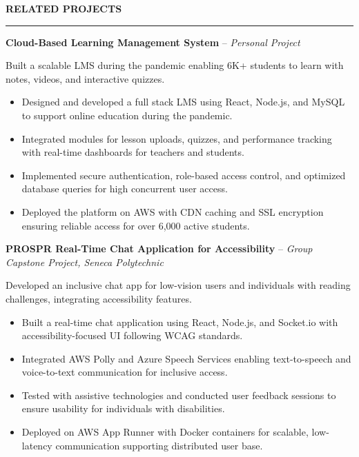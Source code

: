 \documentclass[10pt,letterpaper]{article}
\begin{document}
\vspace{6pt}

\textbf{RELATED PROJECTS}\\[-8pt]
\noindent\rule{\textwidth}{1pt}

\vspace{-2pt}

\textbf{Cloud-Based Learning Management System} -- \emph{Personal Project}

\vspace{-1pt}

Built a scalable LMS during the pandemic enabling 6K+ students to learn with notes, videos, and interactive quizzes.
\vspace{-1pt}
\begin{itemize}
\item Designed and developed a full stack LMS using React, Node.js, and MySQL to support online education during the pandemic.
\item Integrated modules for lesson uploads, quizzes, and performance tracking with real-time dashboards for teachers and students.
\item Implemented secure authentication, role-based access control, and optimized database queries for high concurrent user access.
\item Deployed the platform on AWS with CDN caching and SSL encryption ensuring reliable access for over 6,000 active students.
\end{itemize}

\textbf{PROSPR  Real-Time Chat Application for Accessibility} -- \emph{Group Capstone Project, Seneca Polytechnic }

\vspace{-1pt}

Developed an inclusive chat app for low-vision users and individuals with reading challenges, integrating accessibility features.
\vspace{-1pt}
\begin{itemize}
\item Built a real-time chat application using React, Node.js, and Socket.io with accessibility-focused UI following WCAG standards.
\item Integrated AWS Polly and Azure Speech Services enabling text-to-speech and voice-to-text communication for inclusive access.
\item Tested with assistive technologies and conducted user feedback sessions to ensure usability for individuals with disabilities.
\item Deployed on AWS App Runner with Docker containers for scalable, low-latency communication supporting distributed user base.
\end{itemize}
\end{document}
